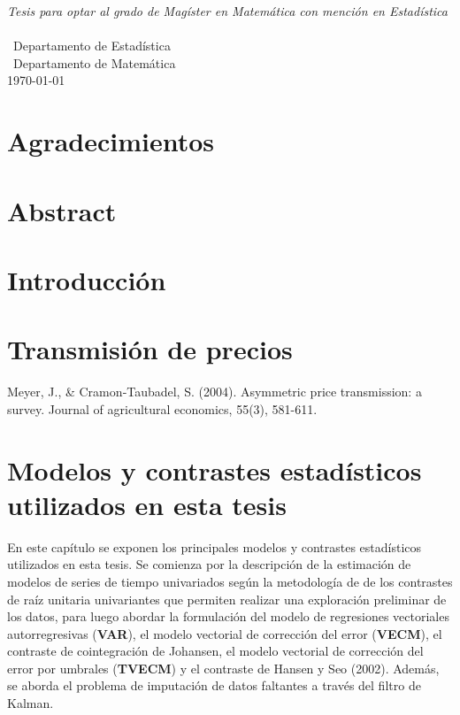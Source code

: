 \documentclass[12pt, twoside]{book}\usepackage[]{graphicx}\usepackage[]{color}
\numberwithin{equation}{section}
\numberwithin{theorem}{section}
\numberwithin{teorema}{section}
\numberwithin{defi}{section}
\numberwithin{prop}{section}
\numberwithin{defi}{section}
\theoremstyle{plain}
\begin{document}
\begin{titlepage}
\begin{center}
\large \textit{Tesis para optar al grado de Magíster en Matemática con mención en Estadística}\\[0.3cm] %
\textit{}\\[0.4cm]
\ Departamento de Estadística \\
[0.4cm]\ Departamento de Matemática
\\[1cm] %
 
{\large \today}\\[2cm] %
 
\end{center}

\end{titlepage}
\newpage



\tableofcontents

\listoffigures
\listoftables
\onehalfspacing
\chapter*{Agradecimientos}
\chapter*{Abstract}
\chapter{Introducción}


\chapter{Transmisión de precios}

Meyer, J., \& Cramon‐Taubadel, S. (2004). Asymmetric price transmission: a survey. Journal of agricultural economics, 55(3), 581-611.


\chapter{Modelos y contrastes estadísticos utilizados en esta tesis}

En este capítulo se exponen los principales modelos y contrastes estadísticos utilizados en esta tesis. Se comienza por la descripción de la estimación de modelos de series de tiempo univariados según la metodología de de los contrastes de raíz unitaria univariantes que permiten realizar una exploración preliminar de los datos, para luego abordar la formulación del modelo de regresiones vectoriales autorregresivas (\textbf{VAR}), el modelo vectorial de corrección del error (\textbf{VECM}), el contraste de cointegración de Johansen, el modelo vectorial de corrección del error por umbrales (\textbf{TVECM}) y el contraste de Hansen y Seo (2002). Además, se aborda el problema de imputación de datos faltantes a través del filtro de Kalman. 
\end{document}

